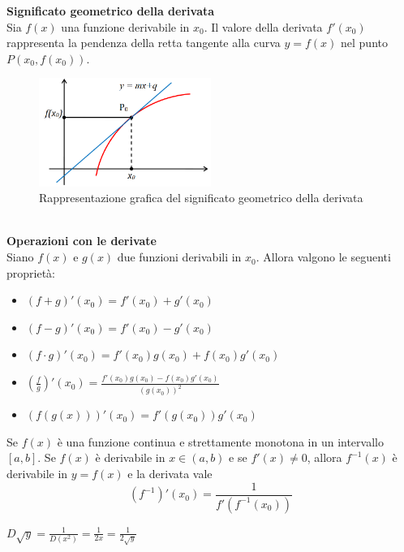 \documentclass{article}
\begin{document}
\textbf{Significato geometrico della derivata}\\
Sia $f(x)$ una funzione derivabile in $x_0$. Il valore della derivata
$f'(x_0)$ rappresenta la pendenza della retta tangente alla curva $y=f(x)$
nel punto $P(x_0,f(x_0))$.
\begin{figure}[h]
    \centering
    \includegraphics[width=0.5\textwidth]{derivgeom.png}
    \caption{Rappresentazione grafica del significato geometrico della derivata}
\end{figure}\\
\textbf{Operazioni con le derivate}\\
Siano $f(x)$ e $g(x)$ due funzioni derivabili in $x_0$. Allora valgono le
seguenti proprietà:
\begin{itemize}
    \item $(f+g)'(x_0) = f'(x_0) + g'(x_0)$
    \item $(f-g)'(x_0) = f'(x_0) - g'(x_0)$
    \item $(f\cdot g)'(x_0) = f'(x_0)g(x_0) + f(x_0)g'(x_0)$
    \item $\left(\frac{f}{g}\right)'(x_0) = \frac{f'(x_0)g(x_0) -
                  f(x_0)g'(x_0)}{(g(x_0))^2}$
    \item $(f(g(x)))'(x_0) = f'(g(x_0))g'(x_0)$
\end{itemize}
Se $f(x)$ è una funzione continua e strettamente monotona in un intervallo $[a,b]$. Se $f(x)$ è derivabile in $x \in (a,b)$ e se $f'(x)\neq0$, allora $f^{-1}(x)$ è derivabile in $y = f(x)$ e la derivata vale
\begin{equation*}
    (f^{-1})'(x_0) = \frac{1}{f'(f^{-1}(x_0))}
\end{equation*}
\begin{esbox}
    $D\sqrt{y}=\frac{1}{D(x^2)}=\frac{1}{2x}=\frac{1}{2\sqrt{y}}$
\end{esbox}
\end{document}
